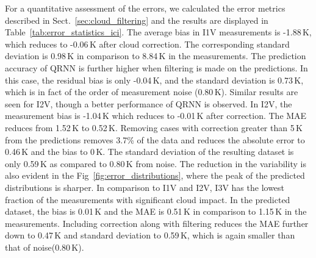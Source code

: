 \documentclass[amt, manuscript]{copernicus}
\begin{document}
For a quantitative assessment of the errors, we calculated the error metrics described in Sect.~\ref{sec:cloud_filtering} and the results are displayed in Table~\ref{tab:error_statistics_ici}. The average bias in I1V measurements is -1.88\,K, which reduces to -0.06\,K after cloud correction. The corresponding standard deviation is 0.98\,K in comparison to 8.84\,K in the measurements. The prediction accuracy of QRNN is further higher when filtering is made on the predictions. In this case, the residual bias is only -0.04\,K, and the standard deviation is 0.73\,K, which is in fact of the order of measurement noise (0.80\,K). Similar results are seen for I2V, though a better performance of QRNN is observed. In I2V, the measurement bias is -1.04\,K which reduces to -0.01\,K after correction. The MAE reduces from 1.52\,K to 0.52\,K. Removing cases with correction greater than 5\,K from the predictions removes 3.7\% of the data and reduces the absolute error to 0.46\,K and the bias to 0\,K. The standard deviation of the resulting dataset is only 0.59\,K as compared to 0.80\,K from noise. The reduction in the variability is also evident in the Fig~\ref{fig:error_distributions}, where the peak of the predicted distributions is sharper. In comparison to I1V and I2V, I3V has the lowest fraction of the measurements with significant cloud impact. In the predicted dataset, the bias is 0.01\,K and the MAE is 0.51\,K in comparison to 1.15\,K  in the measurements. Including correction along with filtering reduces the MAE further down to 0.47\,K and standard deviation to 0.59\,K, which is again smaller than that of noise(0.80\,K).  
\end{document}
